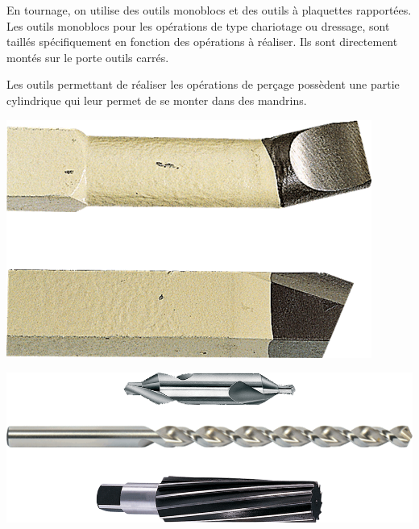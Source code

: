 \documentclass[11pt,oneside]{article}
\begin{document}
\begin{minipage}[c]{.65\linewidth}
En tournage, on utilise des outils monoblocs et des outils à plaquettes rapportées. Les outils monoblocs pour les opérations de type chariotage ou dressage, sont taillés spécifiquement en fonction des opérations à réaliser. Ils sont directement montés sur le porte outils carrés. 

Les outils permettant de réaliser les opérations de perçage possèdent une partie cylindrique qui leur permet de se monter dans des mandrins.
\end{minipage}\hfill
\begin{minipage}[c]{.3\linewidth}
\begin{center}
\includegraphics[width=.7\textwidth]{png/outils_hss}

\vspace{.5cm}

\includegraphics[width=\textwidth]{png/outils_hss_2}
\end{center}
\end{minipage}
\end{document}
